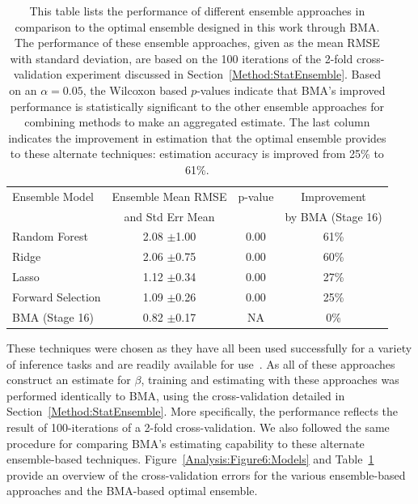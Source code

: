 \documentclass[journal=jpcbfk, manuscript=article]{achemso}
\newcommand{\+}[1]{\ensuremath{\mathbf{#1}}}
\begin{document}
\begin{table}[t!]
	\centering
	\caption[Model comparison with mean RMSE]{This table lists the performance of different ensemble approaches in comparison to the optimal ensemble designed in this work through BMA.
	The performance of these ensemble approaches, given as the mean RMSE with standard deviation, are based on the 100 iterations of the 2-fold cross-validation experiment discussed in Section~\ref{Method:StatEnsemble}.
	Based on an $\alpha = 0.05$, the Wilcoxon based $p$-values indicate that BMA's improved performance is statistically significant to the other ensemble approaches for combining methods to make an aggregated estimate.
	The last column indicates the improvement in estimation that the optimal ensemble provides to these alternate techniques: estimation accuracy is improved from 25\% to 61\%. }
	\footnotesize
	\begin{tabular}{lccc}
		\hline
		\hline
		Ensemble Model  & Ensemble Mean RMSE  & p-value & Improvement\\
		 & and Std Err Mean& & by BMA (Stage 16)\\
		\hline
		Random Forest & 2.08 $\pm$1.00 & 0.00 & 61\%\\
		Ridge & 2.06 $\pm$0.75 & 0.00 & 60\%\\
		Lasso & 1.12 $\pm$0.34 & 0.00 & 27\%\\
		Forward Selection & 1.09 $\pm$0.26 & 0.00 &  25\%\\		
		BMA (Stage 16) & 0.82 $\pm$0.17 & NA & 0\%\\
		\hline
		\hline
	\end{tabular}
	\label{Analysis:Table4:EnsembleCompare}
\end{table}
These techniques were chosen as they have all been used successfully for a variety of inference tasks and are readily available for use~\cite{R:2008,sklearn_api:2013}.
As all of these approaches construct an estimate for $\beta$, training and estimating with these approaches was performed identically to BMA, using the cross-validation detailed in Section~\ref{Method:StatEnsemble}.
More specifically, the performance reflects the result of 100-iterations of a 2-fold cross-validation.
We also followed the same procedure for comparing BMA's estimating capability to these alternate ensemble-based techniques.
Figure~\ref{Analysis:Figure6:Models} and Table~\ref{Analysis:Table4:EnsembleCompare} provide an overview of the cross-validation errors for the various ensemble-based approaches and the BMA-based optimal ensemble.
\end{document}
